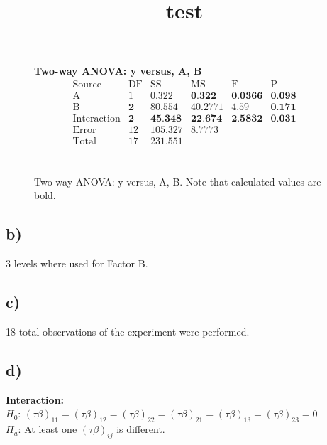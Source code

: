 \documentclass{article}
\begin{document}
\begin{figure}[H]
    \title{test}
    \centering
    \textbf{Two-way ANOVA: y versus, A, B} \\
    \begin{equation*}
        \begin{array}{c|c|c|c|c|c}
            \text{Source} &\text{DF}& \text{SS} & \text{MS} & \text{F} &\text{P}  \\
            \hline
            \text{A}            & \text{1}   & \text{0.322}   & \textbf{0.322}      & \textbf{0.0366}  &\textbf{0.098}  \\
            \text{B}            & \textbf{2} & \text{80.554}  & \text{40.2771}  & \text{4.59} &\textbf{0.171}  \\
            \text{Interaction}  & \textbf{2} & \textbf{45.348}     & \textbf{22.674}      & \textbf{2.5832}  &\textbf{0.031}  \\
            \text{Error}        & \text{12}  & \text{105.327} & \text{8.7773}   &   &  \\
            \text{Total}        & \text{17}  & \text{231.551} &  &  &  \\
        
        \end{array}
        \end{equation*}\\
    \caption{ Two-way ANOVA: y versus, A, B. Note that calculated values are bold. }
\end{figure}

\subsection*{b)}
3 levels where used for Factor B.
\subsection*{c)}
18 total observations of the experiment were performed.
\subsection*{d)}
\begin{flushleft}
    \textbf{Interaction:} \\
    $H_0$: $(\tau \beta)_{11} = (\tau \beta)_{12} = (\tau \beta)_{22} = (\tau \beta)_{21} = (\tau \beta)_{13} = (\tau \beta)_{23} = 0$ \\
    $H_a$: At least one $(\tau \beta)_{ij}$ is different.\\
\end{flushleft}
\end{document}
